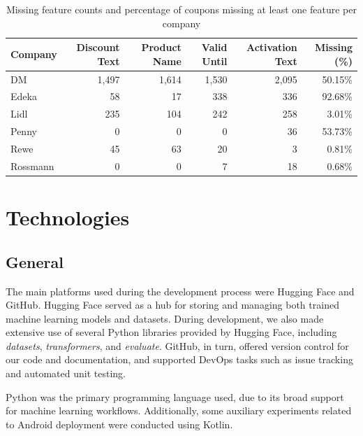 \documentclass[licencjacka,en]{pracamgr}
\begin{document}
\begin{table}[h!]
\raggedright
\setlength{\tabcolsep}{4pt} 
\small %
\begin{tabular}{|l|r|r|r|r|r|}
\hline
\textbf{Company} & \textbf{Discount Text} & \textbf{Product Name} & \textbf{Valid Until} & \textbf{Activation Text} & \textbf{Missing (\%)} \\
\hline
DM        & 1,497 & 1,614 & 1,530 & 2,095 & 50.15\% \\
Edeka     & 58    & 17    & 338   & 336   & 92.68\% \\
Lidl      & 235   & 104   & 242   & 258   & 3.01\% \\
Penny     & 0     & 0     & 0     & 36    & 53.73\% \\
Rewe      & 45    & 63    & 20    & 3     & 0.81\% \\
Rossmann  & 0     & 0     & 7     & 18    & 0.68\% \\
\hline
\end{tabular}
\caption{Missing feature counts and percentage of coupons missing at least one feature per company}
\end{table}

\chapter{Technologies}

\section{General}

The main platforms used during the development process were Hugging Face\cite{hugging-face} and GitHub\cite{github}. Hugging Face served as a hub for storing and managing both trained machine learning models and datasets. During development, we also made extensive use of several Python libraries provided by Hugging Face, including \textit{datasets}\cite{lhoest2021datasetscommunitylibrarynatural}, \textit{transformers}\cite{wolf-etal-2020-transformers}, and \textit{evaluate}\cite{evaluate}. GitHub, in turn, offered version control for our code and documentation, and supported DevOps tasks such as issue tracking and automated unit testing.

Python\cite{python} was the primary programming language used, due to its broad support for machine learning workflows. Additionally, some auxiliary experiments related to Android deployment were conducted using Kotlin\cite{kotlin}\cite{service_demo_app_repo}.
\end{document}
